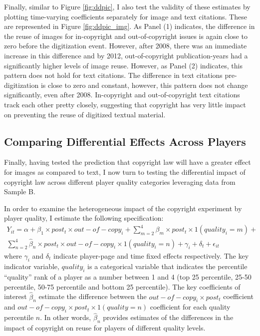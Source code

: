 \documentclass[11pt]{article}
\begin{document}
Finally, similar to Figure \ref{fig:ddpic}, I also test the validity of these estimates by plotting time-varying coefficients separately for image and text citations. These are represented in Figure \ref{fig:ddpic_img}. As Panel (1) indicates, the difference in the reuse of images for in-copyright and out-of-copyright issues is again close to zero before the digitization event. However, after 2008, there was an immediate increase in this difference and by 2012, out-of-copyright publication-years had a significantly higher levels of image reuse. However, as Panel (2) indicates, this pattern does not hold for text citations. The difference in text citations pre-digitization is close to zero and constant, however, this pattern does not change significantly, even after 2008. In-copyright and out-of-copyright text citations track each other pretty closely, suggesting that copyright has very little impact on preventing the reuse of digitized textual material. 

\subsection{Comparing Differential Effects Across Players}
\label{sec:diff2}


Finally, having tested the prediction that copyright law will have a greater effect for images as compared to text, I now turn to testing the differential impact of copyright law across different player quality categories leveraging data from Sample B. 

In order to examine the heterogeneous impact of the copyright experiment by player quality, I estimate the following specification:
\begin{align*}
Y_{it} = \alpha + \beta_1 \times post_t \times out-of-copy_i + \sum\limits_{m=2}^4 \beta_m \times post_t \times 1(quality_i=m) + \\ \sum\limits_{n=2}^4 \hat{\beta}_n \times post_t \times out-of-copy_i \times 1(quality_i=n) + \gamma_i+ \delta_t + \epsilon_{it}
\end{align*}
where $\gamma_i$ and $\delta_t$ indicate player-page and time fixed effects respectively. The key indicator variable, $quality_i$ is a categorical variable that indicates the percentile ``quality'' rank of a player as a number between 1 and 4 (top 25 percentile, 25-50 percentile, 50-75 percentile and bottom 25 percentile). The key coefficients of interest $\hat{\beta}_n$ estimate the difference between the $out-of-copy_i \times post_t$ coefficient and $out-of-copy_i \times post_t \times 1(quality=n)$ coefficient for each quality percentile $n$. In other words, $\hat{\beta}_n$ provides estimates of the differences in the impact of copyright on reuse for players of different quality levels.
\end{document}
